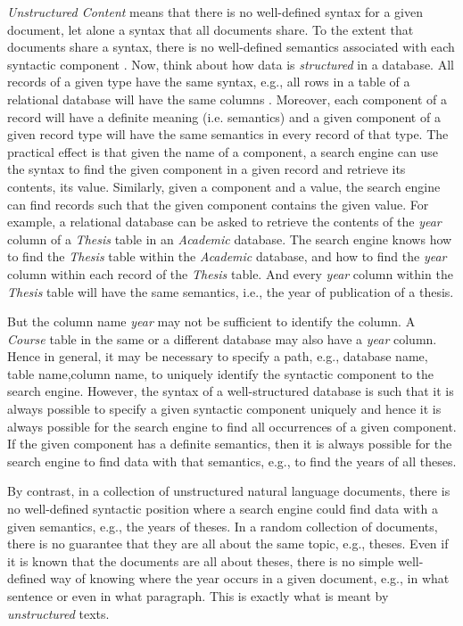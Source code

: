 \textit{Unstructured Content} means that there is no well-defined syntax for a given document, let alone a syntax that all documents share. To the extent that documents share a syntax, there is no well-defined semantics associated with each syntactic component \citep{greengrass2000}. Now, think about how data is \textit{structured} in a database. All records of a given type have the same syntax, e.g., all rows in a table of a relational database will have the same columns \citep{Salton1983}.  Moreover,  each  component  of  a  record  will  have  a  definite meaning (i.e. semantics)  and  a  given  component  of  a  given  record  type  will  have  the  same semantics in every record of that type. The practical effect is that given the name of a component, a search engine can use the syntax to find the given component in a given record and retrieve its contents, its value. Similarly, given a component and a value, the search engine can find records such that the given component contains the given value. For example, a relational database can be asked to retrieve the contents of the \textit{year} column of a \textit{Thesis} table in an \textit{Academic} database. The search engine knows how to find the \textit{Thesis} table within  the  \textit{Academic}  database,  and  how  to  find  the  \textit{year}  column  within  each  record  of  the \textit{Thesis} table.  And  every  \textit{year}  column  within  the  \textit{Thesis}  table  will  have  the  same semantics, i.e., the year of publication of a thesis. 

But the column name \textit{year} may not be sufficient to identify the column. A \textit{Course} table in the same or a different database may also have a \textit{year} column. Hence in general, it may be necessary to specify a path, e.g., database name, table name,column name, to uniquely identify the syntactic component to the search engine. However, the syntax of a well-structured database is such that it is always possible to specify a given syntactic component uniquely and hence it is always possible for the search engine to find all occurrences of a given component. If the given component has a definite semantics, then it is always possible for the search engine to find data with that semantics, e.g., to find the years of all theses. 

By contrast, in a collection of unstructured natural language documents, there is no well-defined syntactic position where a search engine could find data with a given semantics, e.g., the years of theses. In a random collection of documents, there is no guarantee that they are all about the same topic, e.g., theses. Even if it is known that the documents are all about theses, there is no simple well-defined way of knowing where the year occurs in a given document, e.g., in what sentence or even in what paragraph. This is exactly what is meant by \textit{unstructured} texts.

